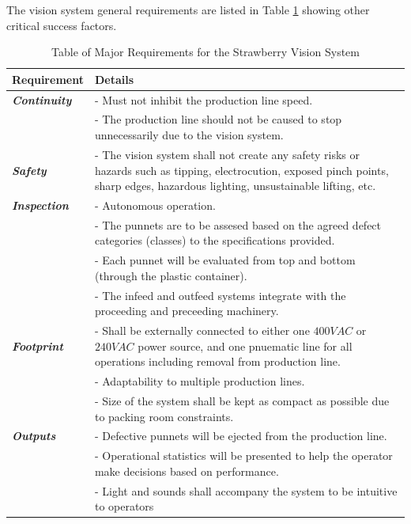 \documentclass[fleqn,twoside,12pt]{report}
\begin{document}
The vision system general requirements are listed in Table \ref{tab:requirements} showing other critical success factors.



\renewcommand{\arraystretch}{0.8}%
\begin{longtable}{p{2.5cm}p{12cm}}
	\caption{Table of Major Requirements for the Strawberry Vision System}
	\label{tab:requirements} \\
	
	\hline\hline
	\textbf{Requirement} & \textbf{Details} \\[2pt]
	\hline \hline
	\textbf{\textit{Continuity}} 	& - Must not inhibit the production line speed. \\[2pt]
	& - The production line should not be caused to stop unnecessarily due to the vision system.\\[2pt]
	\hline
	\textbf{\textit{Safety}}    & - The vision system shall not create any safety risks or hazards such as tipping, electrocution, exposed pinch points, sharp edges, hazardous lighting, unsustainable lifting, etc.  \\[2pt]
	\hline
	\textbf{\textit{Inspection}} 	& - Autonomous operation.\\[2pt]
	& - The punnets are to be assesed based on the agreed defect categories (classes) to the specifications provided. \\[2pt]
	& - Each punnet will be evaluated from top and bottom (through the plastic container). \\[2pt]
	& - The infeed and outfeed systems integrate with the proceeding and preceeding machinery. \\[2pt]
	\hline
	\textbf{\textit{Footprint}}	& - Shall be externally connected to either one $400VAC$ or $240VAC$ power source, and one pnuematic line for all operations including removal from production line.  \\[2pt]
	& - Adaptability to multiple production lines. \\[2pt]
	& - Size of the system shall be kept as compact as possible due to packing room constraints. \\[2pt]
	\hline
	\textbf{\textit{Outputs}}	& - Defective punnets will be ejected from the production line.  \\[2pt]
	& - Operational statistics will be presented to help the operator make decisions based on performance.  \\[2pt]
	& - Light and sounds shall accompany the system to be intuitive to operators \\[2pt]

\end{longtable}
\end{document}
